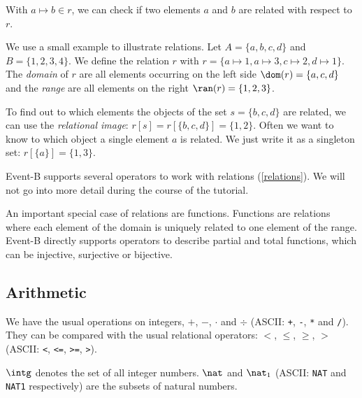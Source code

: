 With $a\mapsto b\in r$, we can check if two elements $a$ and $b$ are related with respect to $r$.

We use a small example to illustrate relations. Let $A = \{a,b,c,d\}$ and $B=\{1,2,3,4\}$.
We define the relation $r$ with $r = \{a\mapsto 1, a\mapsto 3, c\mapsto 2, d\mapsto 1\}$.
The \emph{domain} of $r$ are all elements occurring on the left side $\dom(r) = \{a,c,d\}$ and the
\emph{range} are all elements on the right $\ran(r)=\{1,2,3\}$.

To find out to which elements the objects of the set $s=\{b,c,d\}$ are related, we can use the \emph{relational image}:
$r[s] = r[\{b,c,d\}] = \{1,2\}$.
Often we want to know to which object a single element $a$ is related. We just write it as a singleton
set: $r[\{a\}] = \{1,3\}$.

Event-B supports several operators to work with relations (\ref{relations}).
We will not go into more detail during the course of the tutorial.

An important special case of relations are functions. Functions are relations where each element of the
domain is uniquely related to one element of the range. Event-B directly supports operators to describe
partial and total functions, which can be injective, surjective or bijective.

\subsection{Arithmetic}
\label{tut_arithmetic}
We have the usual operations on integers, $+$, $-$, $\cdot$ and $\div$ (ASCII: \texttt{+}, \texttt{-},
\texttt{*} and \texttt{/}). They can be compared with the usual relational operators: $<$, $\leq$, $\geq$, $>$ (ASCII: \texttt{<}, \texttt{<=}, \texttt{>=}, \texttt{>}).

$\intg$  denotes the set of all integer numbers. $\nat$ and $\nat_1$ (ASCII: \texttt{NAT} and 
\texttt{NAT1} respectively) are the subsets of natural numbers.



